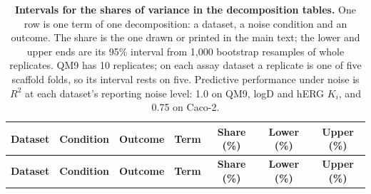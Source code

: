 
{\scriptsize
\begin{longtable}{lllcccc}
\caption{\textbf{\SuppFile{} Intervals for the shares of variance in the decomposition tables.}
One row is one term of one decomposition: a dataset, a noise condition and an outcome. The share is the one drawn or printed in the main text; the lower and upper ends are its 95\% interval from 1,000 bootstrap resamples of whole replicates. QM9 has 10 replicates; on each assay dataset a replicate is one of five scaffold folds, so its interval rests on five. Predictive performance under noise is $R^2$ at each dataset's reporting noise level: 1.0 on QM9, logD and hERG $K_i$, and 0.75 on Caco-2.}
\label{supp:variance_intervals}\\
\toprule
\textbf{Dataset} & \textbf{Condition} & \textbf{Outcome} & \textbf{Term} & \textbf{Share (\%)} & \textbf{Lower (\%)} & \textbf{Upper (\%)} \\
\midrule
\endfirsthead
\toprule
\textbf{Dataset} & \textbf{Condition} & \textbf{Outcome} & \textbf{Term} & \textbf{Share (\%)} & \textbf{Lower (\%)} & \textbf{Upper (\%)} \\
\midrule
\endhead

\bottomrule
\end{longtable}}
